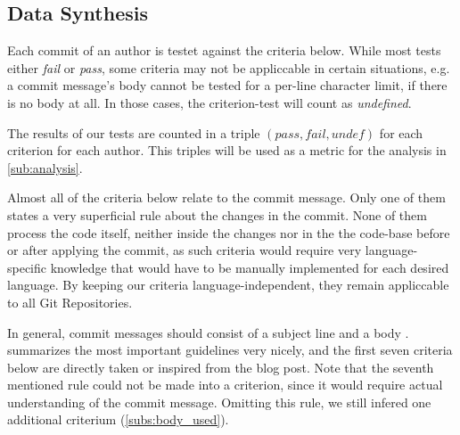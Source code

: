 

\subsection{Data Synthesis}

%
%
%
%
%
%


Each commit of an author is testet against the criteria below. While most tests either \emph{fail} or \emph{pass}, some criteria may not be appliccable in certain situations, e.g. a commit message's body cannot be tested for a per-line character limit, if there is no body at all. In those cases, the criterion-test will count as \emph{undefined}.

The results of our tests are counted in a triple $(pass, fail, undef)$ for each criterion for each author. This triples will be used as a metric for the analysis in \ref{sub:analysis}.

Almost all of the criteria below relate to the commit message. Only one of them states a very superficial rule about the changes in the commit. None of them process the code itself, neither inside the changes nor in the the code-base before or after applying the commit, as such criteria would require very language-specific knowledge that would have to be manually implemented for each desired language. By keeping our criteria language-independent, they remain appliccable to all Git Repositories.

In general, commit messages should consist of a subject line and a body \cite{OffGuide}. \cite{CB} summarizes the most important guidelines very nicely, and the first seven criteria below are directly taken or inspired from the blog post. Note that the seventh mentioned rule could not be made into a criterion, since it would require actual understanding of the commit message. Omitting this rule, we still infered one additional criterium (\ref{subs:body_used}).


